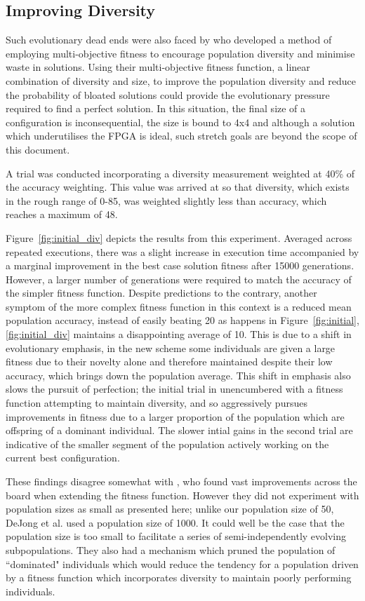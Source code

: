 \subsection{Improving Diversity \label{ss:i_d}}
Such evolutionary
dead ends were also faced by \cite{deJong:2001:RBP:2955239.2955241} who developed
a method of employing multi-objective fitness to encourage population diversity
and minimise waste in solutions. Using their multi-objective fitness function,
a linear combination of diversity and size, to improve the population diversity
and reduce the probability of bloated solutions could provide the evolutionary
pressure required to find a perfect solution. In this situation, the final size
of a configuration is inconsequential, the size is bound to 4x4 and although
a solution which underutilises the FPGA is ideal, such stretch goals are beyond
the scope of this document.

A trial was conducted incorporating a diversity measurement weighted at 40\%
of the accuracy weighting. This value was arrived at so that diversity,
which exists in the rough range of 0-85, was weighted slightly less than
accuracy, which reaches a maximum of 48.

Figure~\ref{fig:initial_div} depicts the results from this experiment. Averaged across
repeated executions, there was a slight increase in execution time accompanied by
a marginal improvement in the best case solution fitness
after 15000 generations. However, a larger number of generations were required
to match the accuracy of the simpler fitness function. Despite predictions
to the contrary, another symptom of
the more complex fitness function in this context is a reduced mean population accuracy,
instead of easily beating 20 as happens in Figure~\ref{fig:initial},
\ref{fig:initial_div} maintains a disappointing
average of 10. This is due to a shift in evolutionary emphasis, in the new
scheme some individuals are given a large fitness due to their novelty alone
and therefore maintained despite their low accuracy, which brings down the
population average. This shift in emphasis also slows the
pursuit of perfection; the initial trial in unencumbered with a fitness function
attempting to maintain diversity, and so aggressively pursues improvements in
fitness due to a larger proportion of the population which are offspring of a
dominant individual. The slower intial gains in the second trial are indicative
of the smaller segment of the population actively working on the current best
configuration.

These findings disagree somewhat with \cite{deJong:2001:RBP:2955239.2955241},
who found vast improvements across the board when extending the fitness
function. However they did not experiment with population sizes as small
as presented here; unlike our population size of 50, DeJong et al. used
a population size of 1000. It could well be the case that
the population size is too small to facilitate a series of semi-independently
evolving subpopulations. They also had a mechanism which pruned the population
of ``dominated" individuals which would reduce the tendency for a population
driven by a fitness function which incorporates diversity to maintain poorly
performing individuals.

